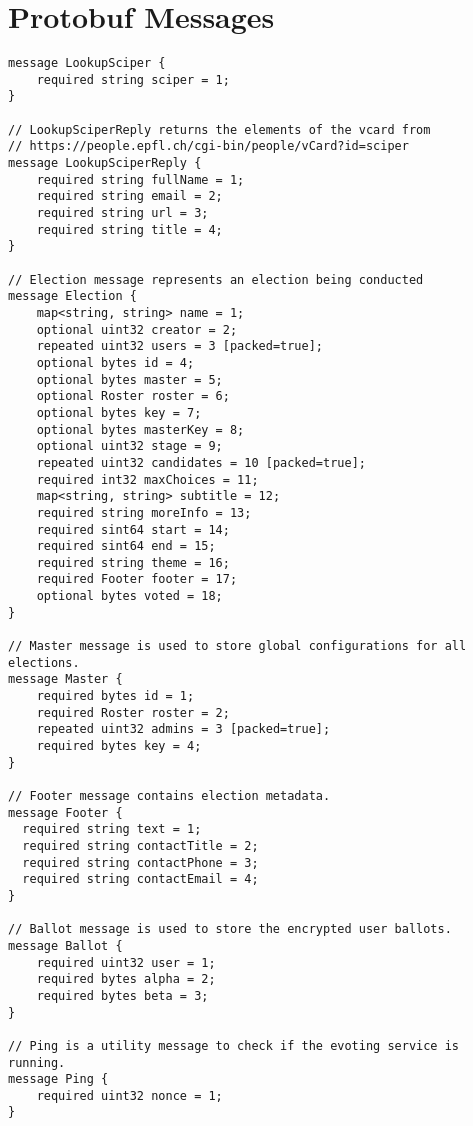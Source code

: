 
\chapter{Protobuf Messages} %

\label{AppendixA} %


\begin{lstlisting}[caption={Protobuf API Specification}, captionpos=b, language=protobuf2, style=protobuf]
message LookupSciper {
	required string sciper = 1;
}

// LookupSciperReply returns the elements of the vcard from
// https://people.epfl.ch/cgi-bin/people/vCard?id=sciper
message LookupSciperReply {
	required string fullName = 1;
	required string email = 2;
	required string url = 3;
	required string title = 4;
}

// Election message represents an election being conducted
message Election {
    map<string, string> name = 1;
    optional uint32 creator = 2;
    repeated uint32 users = 3 [packed=true];
    optional bytes id = 4;
    optional bytes master = 5;
    optional Roster roster = 6;
    optional bytes key = 7;
    optional bytes masterKey = 8;
    optional uint32 stage = 9;
    repeated uint32 candidates = 10 [packed=true];
    required int32 maxChoices = 11;
    map<string, string> subtitle = 12;
    required string moreInfo = 13;
    required sint64 start = 14;
    required sint64 end = 15;
    required string theme = 16;
    required Footer footer = 17;
    optional bytes voted = 18;
}

// Master message is used to store global configurations for all elections.
message Master {
    required bytes id = 1;
    required Roster roster = 2;
    repeated uint32 admins = 3 [packed=true];
    required bytes key = 4;
}

// Footer message contains election metadata.
message Footer {
  required string text = 1;
  required string contactTitle = 2;
  required string contactPhone = 3;
  required string contactEmail = 4;
}

// Ballot message is used to store the encrypted user ballots.
message Ballot {
    required uint32 user = 1;
    required bytes alpha = 2;
    required bytes beta = 3;
}

// Ping is a utility message to check if the evoting service is running.
message Ping {
    required uint32 nonce = 1;
}


\end{lstlisting}
